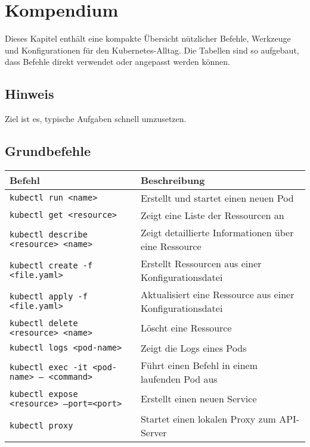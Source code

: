 \chapter{Kompendium}
\label{chap:kompendium}

Dieses Kapitel enthält eine kompakte Übersicht nützlicher Befehle, Werkzeuge und Konfigurationen für den Kubernetes-Alltag.  
Die Tabellen sind so aufgebaut, dass Befehle direkt verwendet oder angepasst werden können.

\section*{Hinweis}
Ziel ist es, typische Aufgaben schnell umzusetzen.

\section{Grundbefehle}
\begin{tabular}{|p{}|p{}|}
\hline
\textbf{Befehl} & \textbf{Beschreibung} \\
\hline
\texttt{kubectl run <name>} & Erstellt und startet einen neuen Pod \\
\texttt{kubectl get <resource>} & Zeigt eine Liste der Ressourcen an \\
\texttt{kubectl describe <resource> <name>} & Zeigt detaillierte Informationen über eine Ressource \\
\texttt{kubectl create -f <file.yaml>} & Erstellt Ressourcen aus einer Konfigurationsdatei \\
\texttt{kubectl apply -f <file.yaml>} & Aktualisiert eine Ressource aus einer Konfigurationsdatei \\
\texttt{kubectl delete <resource> <name>} & Löscht eine Ressource \\
\texttt{kubectl logs <pod-name>} & Zeigt die Logs eines Pods \\
\texttt{kubectl exec -it <pod-name> -- <command>} & Führt einen Befehl in einem laufenden Pod aus \\
\texttt{kubectl expose <resource> --port=<port>} & Erstellt einen neuen Service \\
\texttt{kubectl proxy} & Startet einen lokalen Proxy zum API-Server \\
\hline
\end{tabular}

